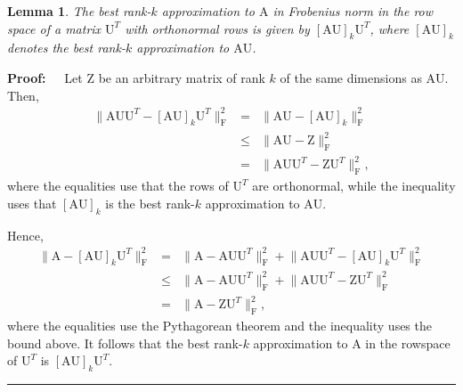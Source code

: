 \documentclass[11pt]{article}
\newcommand{\FNormS}[1]{\mbox{}\|#1\|_\mathrm{F}^2}
\newtheorem{lemma}[theorem]{Lemma}
\newenvironment{proof}{\begin{trivlist} \item {\bf Proof:~~}}
  {\qed\end{trivlist}}
\newcommand{\mat}[1]{{\ensuremath{\bm{\mathrm{#1}}}}}
\def\matA{\mat{A}}
\def\matU{\mat{U}}
\def\matZ{\mat{Z}}
\def\qed{\hfill\rule{2mm}{2mm}}
\begin{document}
\begin{lemma}\label{lem:pythagorean}
The best rank-$k$ approximation to $\matA$ in Frobenius norm in the row space
of a matrix $\matU^T$ with orthonormal rows is given by $[\matA\matU]_k \matU^T$, where 
$[\matA\matU]_k$ denotes the best rank-$k$ approximation to $\matA\matU$.
\end{lemma}
\begin{proof}
Let $\matZ$ be an arbitrary matrix of rank $k$ of the same dimensions as $\matA\matU$. Then,
\begin{eqnarray*}
\FNormS{\matA\matU\matU^T - [\matA\matU]_k \matU^T} & = & \FNormS{\matA\matU - [\matA\matU]_k}\\
& \leq & \FNormS{\matA\matU - \matZ}\\
& = & \FNormS{\matA\matU\matU^T - \matZ\matU^T},
\end{eqnarray*}
where the equalities use that the rows of $\matU^T$ are orthonormal, while the 
inequality uses that $[\matA\matU]_k$ is the best rank-$k$ approximation to $\matA\matU$. 

Hence, 
\begin{eqnarray*}
\FNormS{\matA - [\matA\matU]_k \matU^T} & = & \FNormS{\matA-\matA\matU\matU^T} + \FNormS{\matA\matU\matU^T - [\matA\matU]_k \matU^T}\\
& \leq & \FNormS{\matA-\matA\matU\matU^T} + \FNormS{\matA\matU\matU^T - \matZ\matU^T}\\
& = & \FNormS{\matA-\matZ\matU^T},
\end{eqnarray*}
where the equalities use the Pythagorean theorem and the inequality uses
the bound above. It follows that the best rank-$k$ approximation to $\matA$ in the rowspace of $\matU^T$
is $[\matA\matU]_k \matU^T$. 
\end{proof}
\end{document}
